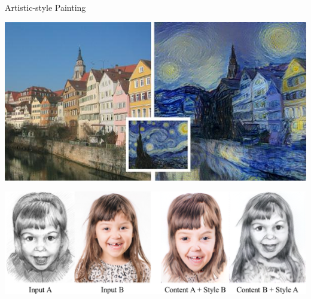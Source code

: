\documentclass{beamer}
\begin{document}
  {
    \begin{frame}{Artistic-style Painting}
      \begin{center}
        \includegraphics[height=.4\textheight]{../img/art_Van_Gogh.jpg}
        \pause

        \includegraphics[height=.44\textheight]{../img/art_girl.png}
      \end{center}
    \end{frame}
  }
\end{document}
